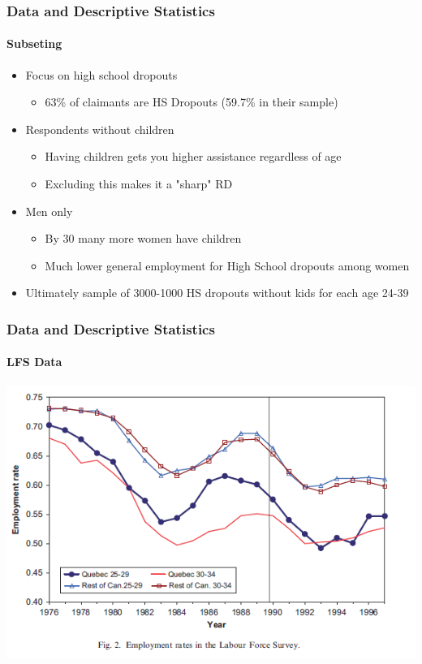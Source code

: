 \documentclass{beamer}
\begin{document}
\begin{frame}
\frametitle{Data and Descriptive Statistics}
\framesubtitle{Subseting}
\begin{itemize}
	\item Focus on high school dropouts 
	\begin{itemize}
		\item 63\% of claimants are HS Dropouts (59.7\% in their sample)
	\end{itemize}
	\item Respondents without children 
	\begin{itemize}
		\item Having children gets you higher assistance regardless of age 
		\item Excluding this makes it a "sharp" RD 
	\end{itemize}
	\item Men only 
	\begin{itemize}
		\item By 30 many more women have children 
		\item Much lower general employment for High School dropouts among women
	\end{itemize}
	\item Ultimately sample of 3000-1000 HS dropouts without kids  for each age 24-39
\end{itemize}

\end{frame}


\begin{frame}
\frametitle{Data and Descriptive Statistics}
\framesubtitle{LFS Data }

	\begin{center}
	\includegraphics[width=.95\linewidth]{fig_2.PNG}
	
\end{center}


\end{frame}
\end{document}
